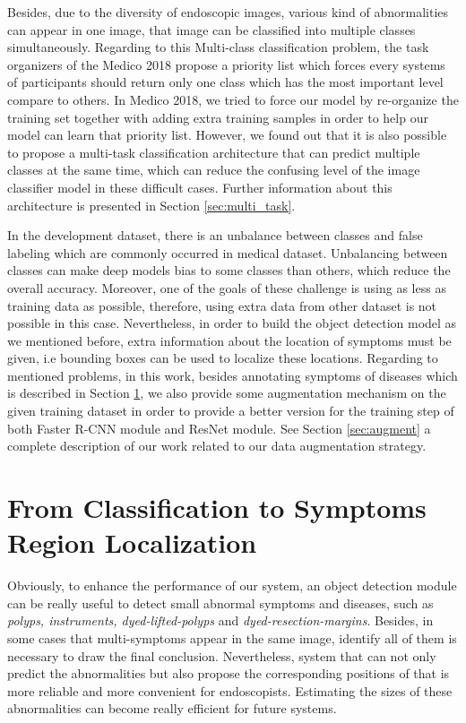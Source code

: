 Besides, due to the diversity of endoscopic images, various kind of abnormalities can appear in one image, that image can be classified into multiple classes simultaneously. Regarding to this  Multi-class classification problem, the task organizers of the Medico 2018 propose a priority list which forces every systems of participants should return only one class which has the most important level compare to others. In Medico 2018, we tried to force our model by re-organize the training set together with adding extra training samples in order to help our model can learn that priority list. However, we found out that it is also possible to propose a multi-task classification architecture that can predict multiple classes at the same time, which can reduce the confusing level of the image classifier model in these difficult cases. Further information about this architecture is presented in Section \ref{sec:multi_task}.
 
In the development dataset, there is an unbalance between classes and false labeling which are commonly occurred in medical dataset. Unbalancing between classes can make deep models bias to some classes than others, which reduce the overall accuracy. Moreover, one of the goals of these challenge is using as less as training data as possible, therefore, using extra data from other dataset is not possible in this case. Nevertheless, in order to build the object detection model as we mentioned before, extra information about the location of symptoms must be given, i.e bounding boxes can be used to localize these locations. Regarding to mentioned problems, in this work, besides annotating symptoms of diseases which is described in Section \ref{sec:symptoms_local}, we also provide some augmentation mechanism on the given training dataset in order to provide a better version for the training step of both Faster R-CNN module and ResNet module. See Section \ref{sec:augment} a complete description of our work related to our data augmentation strategy.  

\section{From Classification to Symptoms Region Localization}
\label{sec:symptoms_local}
Obviously, to enhance the performance of our system, an object detection module can be really useful to detect small abnormal symptoms and diseases, such as \textit{polyps, instruments, dyed-lifted-polyps} and \textit{dyed-resection-margins}. Besides, in some cases that multi-symptoms appear in the same image, identify all of them is necessary to draw the final conclusion. Nevertheless, system that can not only predict the abnormalities but also propose the corresponding positions of that is more reliable and more convenient for endoscopists. Estimating the sizes of these abnormalities can  become really efficient for future systems. 

